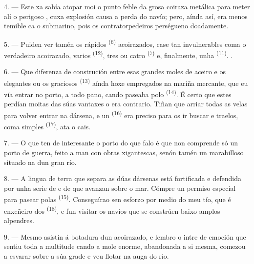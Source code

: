 \VUsaut{3.0mm}
\VUsaut{3.0mm}

4. --- Este xa sabía atopar moi  o punto feble da grosa coiraza
metálica para meter alí o perigoso , cuxa explosión causa a perda do
navío; pero, aínda así, era menos temible ca o submarino, pois os contratorpedeiros
perségueno doadamente.

5. --- Puiden ver tamén os rápidos  \textsuperscript{(6)}
acoirazados, case tan invulnerables coma o verdadeiro acoirazado, varios
 \textsuperscript{(12)}, tres ou catro 
\textsuperscript{(7)} e, finalmente, unha  \textsuperscript{(11)}.
.

6. --- Que diferenza de construción entre esas grandes moles de aceiro e os elegantes
 ou os graciosos  \textsuperscript{(13)} aínda
hoxe empregados na mariña mercante, que eu vía entrar no porto, a todo pano, cando
paseaba polo  \textsuperscript{(14)}. É certo que estes perdían moitas
das súas vantaxes  o  era contrario. Tiñan que arriar
todas as velas para volver entrar na dársena, e un 
\textsuperscript{(16)} era preciso para os ir buscar e traelos, coma simples
 \textsuperscript{(17)}, ata o cais.

\VUsaut{3.0mm}
\VUsaut{3.0mm}

7. --- O que ten de interesante o porto do que falo é que non comprende só un porto
de guerra, feito a man con obras xigantescas, senón tamén un marabilloso  situado na  dun gran río.

8. --- A lingua de terra que separa as dúas dársenas está fortificada e defendida por
unha serie de  e de  que avanzan sobre o mar. Cómpre
un permiso especial para pasear polas  \textsuperscript{(15)}.
Conseguírao sen esforzo por medio do meu tío, que é enxeñeiro dos 
\textsuperscript{(18)}, e fun visitar os navíos que se constrúen baixo amplos
alpendres.

9. --- Mesmo asistín á botadura dun acoirazado, e lembro o intre de emoción que sentiu
toda a multitude cando a mole enorme, abandonada a si mesma, comezou a esvarar sobre a
súa grade e veu flotar na auga do río.

